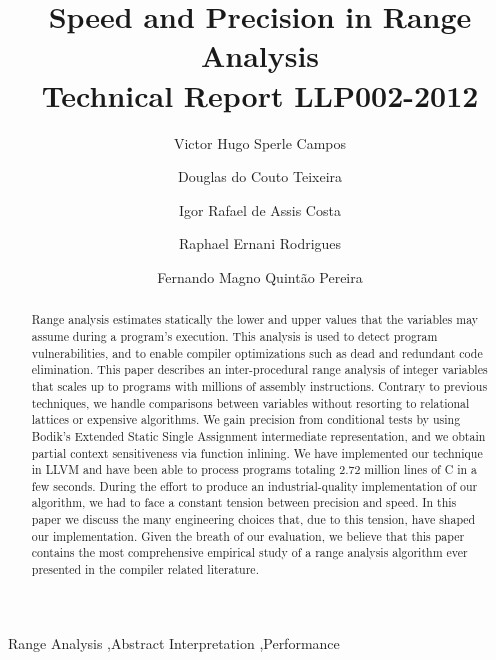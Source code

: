 \documentclass[preprint]{elsarticle}
\begin{document}
\begin{frontmatter}

\title{Speed and Precision in Range Analysis \\
Technical Report LLP002-2012}


\author[llp]{Victor Hugo Sperle Campos}

\author[llp]{Douglas do Couto Teixeira}

\author[llp]{Igor Rafael de Assis Costa}

\author[llp]{Raphael Ernani Rodrigues}

\author[llp]{Fernando Magno Quint\~{a}o Pereira}


\address[llp]{UFMG -- 6627 Ant\^{o}nio Carlos Av, 31.270-010, Belo Horizonte, Brazil}

\begin{abstract}
Range analysis estimates statically the lower and upper values that
the variables may assume during a program's execution.
This analysis is used to detect program vulnerabilities, and to enable compiler
optimizations such as dead and redundant code elimination.
This paper describes an inter-procedural range analysis of integer variables
that scales up to programs with millions of assembly instructions.
Contrary to previous techniques, we handle comparisons between variables
without resorting to relational lattices or expensive algorithms.
We gain precision from conditional tests by using Bodik's Extended Static
Single Assignment intermediate representation, and we obtain partial
context sensitiveness via function inlining.
We have implemented our technique in LLVM and have been able to process
programs totaling 2.72 million lines of C in a few seconds.
During the effort to produce an industrial-quality implementation of our
algorithm, we had to face a constant tension between precision and speed.
In this paper we discuss the many engineering choices that, due to this tension,
have shaped our implementation.
Given the breath of our evaluation, we believe that this paper contains the most
comprehensive empirical study of a range analysis algorithm ever presented in
the compiler related literature.
\end{abstract}

\begin{keyword}
Range Analysis \sep Abstract Interpretation \sep Performance
\end{keyword}

\end{frontmatter}
\end{document}
